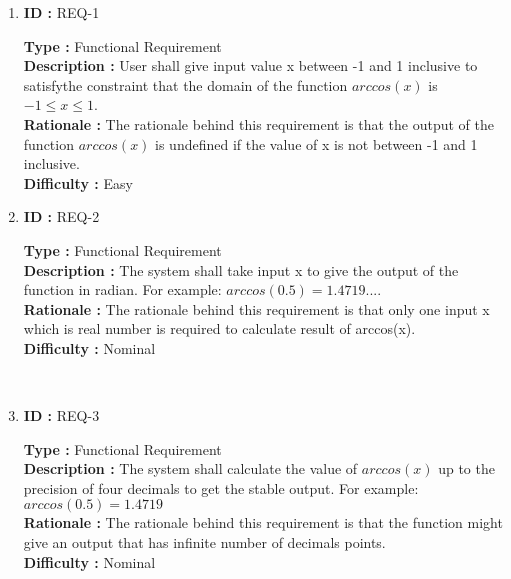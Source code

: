 \documentclass{article}
\begin{document}
\begin{enumerate}[label=(\alph*)]
\item \textbf{ID \hspace{1.95cm}: } REQ-1
\\
\begin{Large}
 \large \textbf{Type \hspace{1.15cm} : } Functional Requirement
 \\
 \large \textbf{ Description  : }User shall give input value x between -1 and 1 inclusive to satisfythe constraint that the domain of the function $arccos(x)$ is $-1\le x\le1$.
 \\
  \large \textbf{Rationale \hspace{0.4cm}:} The rationale behind this requirement is that the output of the function $arccos(x)$ is undefined if the value of x is not between -1 and 1 inclusive.
 \\
 \large \textbf{Difficulty \hspace{0.45cm}:} Easy
\end{Large}

\item \textbf{ID \hspace{1.95cm}: } REQ-2
\\
\begin{Large}
 \large \textbf{Type \hspace{1.15cm} : } Functional Requirement
 \\
 \large \textbf{ Description  : } The system shall take input x to give the output of the function in radian. For example: $arccos(0.5)=1.4719...$.
 \\
  \large \textbf{Rationale \hspace{0.4cm}:} The rationale behind this requirement is that only one input x which is real number is required to calculate result of arccos(x).
 \\
 \large \textbf{Difficulty \hspace{0.45cm}:} Nominal
\end{Large}
\\

\item \textbf{ID \hspace{1.95cm}: } REQ-3
\\
\begin{Large}
 \large \textbf{Type \hspace{1.15cm} : } Functional Requirement
 \\
 \large \textbf{ Description  : } The system shall calculate the value of $arccos(x)$ up to the precision of four decimals to get the stable output. For example: $arccos(0.5)=1.4719$
 \\
  \large \textbf{Rationale \hspace{0.4cm}:} The rationale behind this requirement is that the function might give an output that has infinite number of decimals points. 
 \\
 \large \textbf{Difficulty \hspace{0.45cm}:} Nominal
\end{Large}
\end{enumerate}
\end{document}
